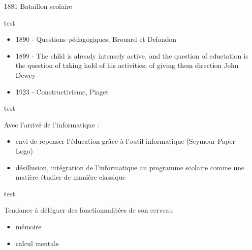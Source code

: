 \begin{frame}{1881 Bataillon scolaire}
\end{frame}

\begin{frame}{test}
  \begin{itemize}
  \item 1890 - Questions pédagogiques, Brouard et Defondon
  \item 1899 - \og{}The child is already intensely active, and the question 
  of eductation is the question of taking hold of his activities, of 
  giving them direction\fg{} John Dewey
  \item 1923 - Constructivisme, Piaget
  \end{itemize}
  
\end{frame}

\begin{frame}{test}

Avec l'arrivé de l'informatique :
\begin{itemize}
\item envi de repenser l'éducation grâce à l'outil informatique (Seymour Paper Logo)
\item désillusion, intégration de l'informatique au programme scolaire comme une matière étudier de manière classique
\end{itemize}

\end{frame}

\begin{frame}{test}

Tendance à déléguer des fonctionnalitées de son cerveau 
\begin{itemize}
\item mémoire
\item calcul mentale
\end{itemize}

\end{frame}
